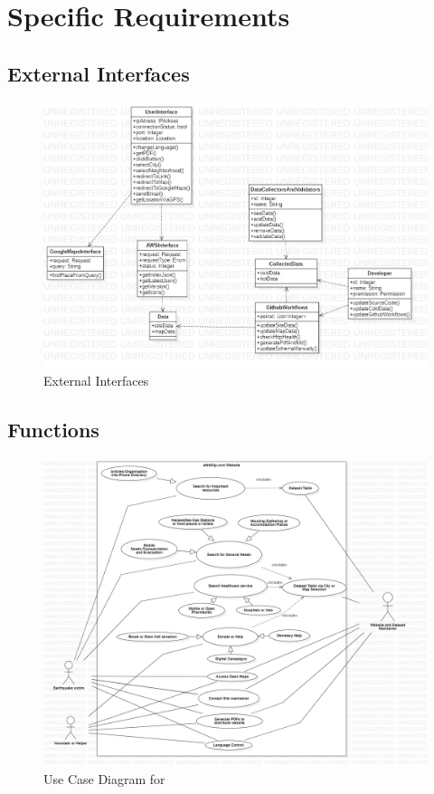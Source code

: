 \section{Specific Requirements}

\subsection{External Interfaces}

\vfill
\begin{figure}[H]
  \centering
  \includegraphics[width=\linewidth]{img/external-interfaces.jpg}
  \caption{External Interfaces}
\end{figure}
\vfill
\newpage

\subsection{Functions}

\vfill
\begin{figure}[H]
  \centering
  \includegraphics[width=\linewidth]{img/use-case-diagram.jpg}
  \caption{Use Case Diagram for \afetbilgi}
\end{figure}
\vfill
\newpage

